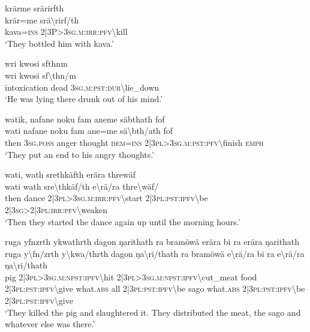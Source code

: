 \ea\label{ex:11:a2569}
krärme srärirfth\\
\gll krär=me	srä{\textbackslash}rirf/th\\
     kava=\textsc{ins}	2|3P>3\textsc{sg}.\textsc{m}:\textsc{irr}:\textsc{pfv}{\textbackslash}kill\\
\glt `They bottled him with kava.'
\z

\ea\label{ex:11:a2570}
wri kwosi sfthnm\\
\gll wri	kwosi	sf{\textbackslash}thn/m\\
     intoxication	dead	3\textsc{sg}.\textsc{m}:\textsc{pst}:\textsc{dur}{\textbackslash}lie\_down\\
\glt `He was lying there drunk out of his mind.'
\z

\ea\label{ex:11:a2571}
watik, nafane noku fam aneme säbthath fof\\
\gll wati	nafane	noku	fam	ane=me	sä{\textbackslash}bth/ath	fof\\
     then	3\textsc{sg}.\textsc{poss}	anger	thought	\textsc{dem}=\textsc{ins}	2|3\textsc{pl}>3\textsc{sg}.\textsc{m}:\textsc{pst}:\textsc{pfv}{\textbackslash}finish	\textsc{emph}\\
\glt `They put an end to his angry thoughts.'
\z

\ea\label{ex:11:a2572}
wati, wath srethkäfth erära threwäf\\
\gll wati	wath	sre{\textbackslash}thkäf/th	e{\textbackslash}rä/ra	thre{\textbackslash}wäf/\\
     then	dance	2|3\textsc{pl}>3\textsc{sg}.\textsc{m}:\textsc{irr}:\textsc{pfv}{\textbackslash}start	2|3\textsc{pl}:\textsc{pst}:\textsc{ipfv}{\textbackslash}be	2|3\textsc{sg}>2|3\textsc{pl}:\textsc{irr}:\textsc{pfv}{\textbackslash}weaken\\
\glt `Then they started the dance again up until the morning hours.'
\z

\ea\label{ex:11:a2574}
ruga yfnzrth ykwathrth dagon ŋarithath ra bramöwä erära bi ra erära ŋarithath\\
\gll ruga	y{\textbackslash}fn/zrth	y{\textbackslash}kwa/thrth	dagon	ŋa{\textbackslash}ri/thath	ra	bramöwä	e{\textbackslash}rä/ra	bi	ra	e{\textbackslash}rä/ra	ŋa{\textbackslash}ri/thath\\
     pig	2|3\textsc{pl}>3\textsc{sg}.\textsc{m}:\textsc{npst}:\textsc{ipfv}{\textbackslash}hit	2|3\textsc{pl}>3\textsc{sg}.\textsc{m}:\textsc{npst}:\textsc{ipfv}{\textbackslash}cut\_meat	food	2|3\textsc{pl}:\textsc{pst}:\textsc{ipfv}{\textbackslash}give	what.\textsc{abs}	all	2|3\textsc{pl}:\textsc{pst}:\textsc{ipfv}{\textbackslash}be	sago	what.\textsc{abs}	2|3\textsc{pl}:\textsc{pst}:\textsc{ipfv}{\textbackslash}be	2|3\textsc{pl}:\textsc{pst}:\textsc{ipfv}{\textbackslash}give\\
\glt `They killed the pig and slaughtered it. They distributed the meat, the sago and whatever else was there.'
\z

